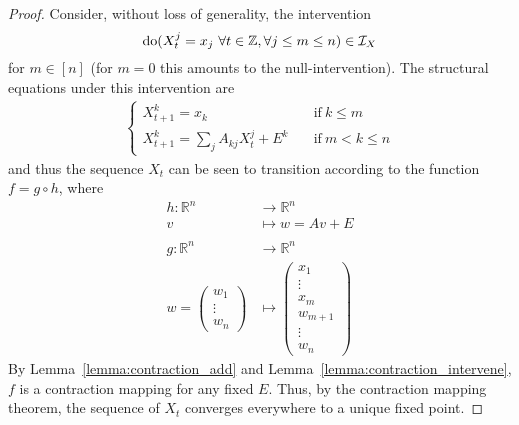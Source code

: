 \begin{proof}
Consider, without loss of generality, the intervention
\[ \operatorname{do}(X_t^j=x_j\ \forall t\in\mathbb{Z},\forall j \leq m \leq n) \in \mathcal{I}_X \]
for $m \in [n]$ (for $m=0$ this amounts to the null-intervention).
The structural equations under this intervention are
\begin{align*}
\begin{cases}
X^k_{t+1} = x_k \quad &\text{if} \:  k \leq m \\
X^k_{t+1} = \sum_j A_{kj}X^j_{t} + E^k  \quad &\text{if} \: m < k \leq n
\end{cases}
\end{align*}
and thus the sequence $X_t$ can be seen to transition according to the function $f = g\circ h$, where
\begin{align*}
    h: \mathbb{R}^n &\to \mathbb{R}^n \\
    v &\mapsto w = Av + E \\
    \\
    g : \mathbb{R}^n &\to \mathbb{R}^n \\
    w = \begin{pmatrix}w_1\\\vdots\\w_n\end{pmatrix} &\mapsto
    \begin{pmatrix} x_1\\\vdots\\x_m\\w_{m+1}\\\vdots\\w_n \end{pmatrix}
\end{align*}
By Lemma~\ref{lemma:contraction_add} and Lemma~\ref{lemma:contraction_intervene}, $f$ is a contraction mapping for any fixed $E$.
Thus, by the contraction mapping theorem, the sequence of $X_t$ converges everywhere to a unique fixed point.
\end{proof}

\medskip


